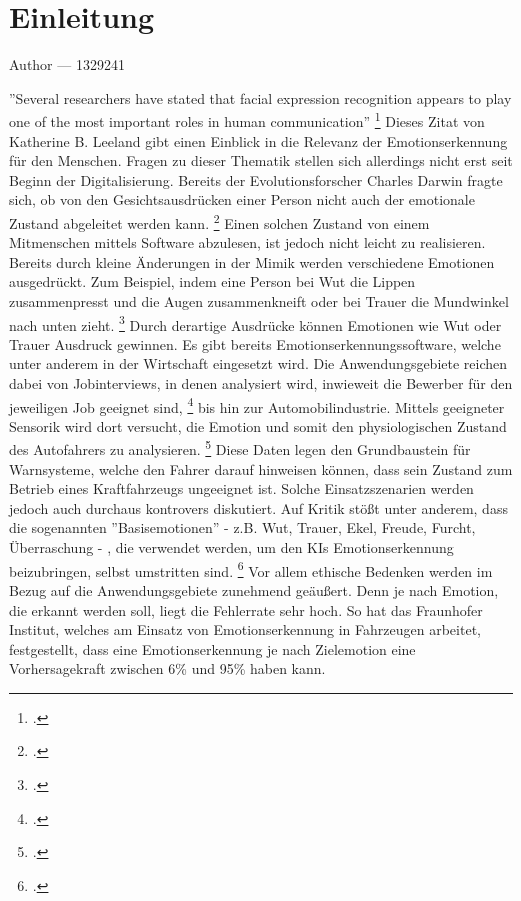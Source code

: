 \documentclass[12pt, a4paper]{report}
\makeatletter
\newcommand{\chapterauthor}[1]{%
  {\parindent0pt\vspace*{-25pt}%
  \large{Author --- }
  \linespread{1.1}\large\scshape#1%
  \par\nobreak\vspace*{35pt} }
  \@afterheading%
}
\makeatother
\begin{document}
\chapter{Einleitung}
\chapterauthor{1329241}
\pagestyle{plain}
\setcounter{page}{1}
''Several researchers have stated that facial expression recognition appears to play one of the most important roles in human communication'' 
\footcite[Vgl.][1]{FaceRec}
Dieses Zitat von Katherine B. Leeland gibt einen Einblick in die Relevanz der Emotionserkennung für den Menschen. Fragen zu dieser Thematik stellen sich allerdings nicht erst seit Beginn der Digitalisierung. Bereits der Evolutionsforscher Charles Darwin
fragte sich, ob von den Gesichtsausdrücken einer Person nicht auch der emotionale Zustand abgeleitet werden kann.
\footcite[Vgl.][2]{FaceRec}
Einen solchen Zustand von einem Mitmenschen mittels Software abzulesen, ist jedoch nicht leicht zu realisieren. Bereits durch kleine Änderungen in der Mimik werden verschiedene Emotionen ausgedrückt. Zum Beispiel, indem eine Person bei Wut die Lippen zusammenpresst und die Augen zusammenkneift oder bei Trauer die Mundwinkel nach unten zieht.
\footcite[Vgl.][249]{HandbookFaceRec}
Durch derartige Ausdrücke können Emotionen wie Wut oder Trauer Ausdruck gewinnen.
Es gibt bereits Emotionserkennungssoftware, welche unter anderem in der Wirtschaft eingesetzt wird. Die Anwendungsgebiete reichen dabei von Jobinterviews, in denen analysiert wird, inwieweit die Bewerber für den jeweiligen Job geeignet sind,
\footcite[Vgl.][]{mixedArticle}
bis hin zur Automobilindustrie. Mittels geeigneter Sensorik wird dort versucht, die Emotion und somit den physiologischen Zustand des Autofahrers zu analysieren.
\footcite[Vgl.][Herausforderung]{Frauenhofer}
Diese Daten legen den Grundbaustein für Warnsysteme, welche den Fahrer darauf hinweisen können, dass sein Zustand zum Betrieb eines Kraftfahrzeugs ungeeignet ist. Solche Einsatzszenarien werden jedoch auch durchaus kontrovers diskutiert. Auf Kritik stößt unter anderem, dass die sogenannten ''Basisemotionen'' - z.B. Wut, Trauer, Ekel, Freude, Furcht, Überraschung - , die verwendet werden, um den KIs Emotionserkennung beizubringen, selbst umstritten sind.
\footcite[Vgl.][]{SZ}
Vor allem ethische Bedenken werden im Bezug auf die Anwendungsgebiete zunehmend geäußert. Denn je nach Emotion, die erkannt werden soll, liegt die Fehlerrate sehr hoch. So hat das Fraunhofer Institut, welches am Einsatz von Emotionserkennung in Fahrzeugen arbeitet, festgestellt, dass eine Emotionserkennung je nach Zielemotion eine Vorhersagekraft zwischen 6\% und 95\% haben kann.
\end{document}
